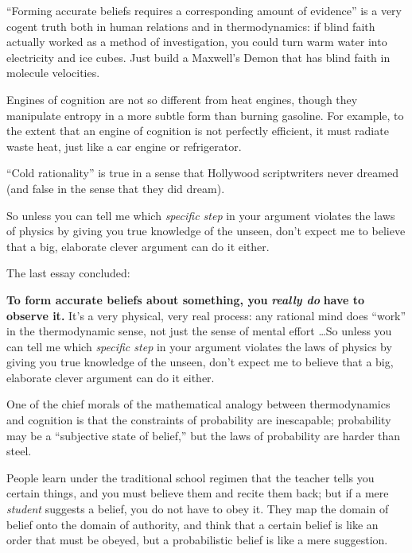 {
 ``Forming accurate beliefs requires a
corresponding amount of evidence'' is a very cogent
truth both in human relations and in thermodynamics: if blind faith
actually worked as a method of investigation, you could turn warm water
into electricity and ice cubes. Just build a Maxwell's
Demon that has blind faith in molecule velocities.}

{
 Engines of cognition are not so different from heat engines,
though they manipulate entropy in a more subtle form than burning
gasoline. For example, to the extent that an engine of cognition is not
perfectly efficient, it must radiate waste heat, just like a car engine
or refrigerator.}

{
 ``Cold rationality'' is true in
a sense that Hollywood scriptwriters never dreamed (and false in the
sense that they did dream).}

{
 So unless you can tell me which \textit{specific step} in your
argument violates the laws of physics by giving you true knowledge of
the unseen, don't expect me to believe that a big,
elaborate clever argument can do it either.}

\myendsectiontext


{
 The last essay concluded:}

{
 \textbf{To form accurate beliefs about something, you
}\textbf{\textit{really do}}\textbf{ have to observe it.}
It's a very physical, very real process: any rational
mind does ``work'' in the
thermodynamic sense, not just the sense of mental effort \ldots So
unless you can tell me which \textit{specific step} in your argument
violates the laws of physics by giving you true knowledge of the
unseen, don't expect me to believe that a big,
elaborate clever argument can do it either.}

{
 One of the chief morals of the mathematical analogy between
thermodynamics and cognition is that the constraints of probability are
inescapable; probability may be a ``subjective state
of belief,'' but the laws of probability are harder
than steel.}

{
 People learn under the traditional school regimen that the teacher
tells you certain things, and you must believe them and recite them
back; but if a mere \textit{student} suggests a belief, you do not have
to obey it. They map the domain of belief onto the domain of authority,
and think that a certain belief is like an order that must be obeyed,
but a probabilistic belief is like a mere suggestion.}

